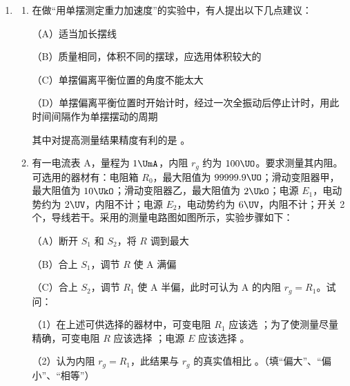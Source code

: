\documentclass[\gkver]{gaokaozhenti}
\begin{document}
\begin{enumerate}

{figs/21b.png}
{figs/21c.png}
{figs/21d.png}


\item
\begin{enumerate}
	\item
	在做“用单摆测定重力加速度”的实验中，有人提出以下几点建议：

	（A）适当加长摆线

	（B）质量相同，体积不同的摆球，应选用体积较大的

	（C）单摆偏离平衡位置的角度不能太大

	（D）单摆偏离平衡位置时开始计时，经过一次全振动后停止计时，用此时间间隔作为单摆摆动的周期

	其中对提高测量结果精度有利的是 。

	\item
	有一电流表 A，量程为 $1\UmA$，内阻 $r_{g}$ 约为 $100\UO$。要求测量其内阻。可选用的器材有：电阻箱 $R_{0}$，最大阻值为 $99999.9\UO$；滑动变阻器甲，最大阻值为 $10\UkO$；滑动变阻器乙，最大阻值为 $2\UkO$；电源 $E_{1}$，电动势约为 $2\UV$，内阻不计；电源 $E_{2}$，电动势约为 $6\UV$，内阻不计；开关 2 个，导线若干。采用的测量电路图如图所示，实验步骤如下：

	（A）断开 $S_{1}$ 和 $S_{2}$，将 $R$ 调到最大

	（B）合上 $S_{1}$，调节 $R$ 使 A 满偏

	（C）合上 $S_{2}$，调节 $R_{1}$ 使 A 半偏，此时可认为 A 的内阻 $r_{g}=R_{1}$。试问：

	（1）在上述可供选择的器材中，可变电阻 $R_{1}$ 应该选 ；为了使测量尽量精确，可变电阻 $R$ 应该选择 ；电源 $E$ 应该选择 。

	（2）认为内阻 $r_{g}=R_{1}$，此结果与 $r_{g}$ 的真实值相比 。（填“偏大”、“偏小”、“相等”）
\end{enumerate}


\end{enumerate}
\end{document}
